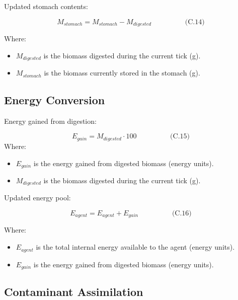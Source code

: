 \documentclass[
]{book}
\begin{document}
Updated stomach contents:

\[
\begin{equation} M_{stomach} = M_{stomach} - M_{digested}  \hspace{2cm} \text{(C.14)} \end{equation}
\]

Where:

\begin{itemize}
\item
  \(M_{digested}\) is the biomass digested during the current tick (g).
\item
  \(M_{stomach}\) is the biomass currently stored in the stomach (g).
\end{itemize}

\subsection{Energy Conversion}\label{energy-conversion}

Energy gained from digestion:

\[
\begin{equation} E_{gain} = M_{digested} \cdot 100  \hspace{2cm} \text{(C.15)} \end{equation}
\] Where:

\begin{itemize}
\item
  \(E_{gain}\) is the energy gained from digested biomass (energy
  units).
\item
  \(M_{digested}\) is the biomass digested during the current tick (g).
\end{itemize}

Updated energy pool:

\[
\begin{equation} E_{agent} = E_{agent} + E_{gain}  \hspace{2cm} \text{(C.16)} \end{equation}
\]

Where:

\begin{itemize}
\item
  \(E_{agent}\) is the total internal energy available to the agent
  (energy units).
\item
  \(E_{gain}\) is the energy gained from digested biomass (energy
  units).
\end{itemize}

\subsection{Contaminant Assimilation}\label{contaminant-assimilation}
\end{document}
